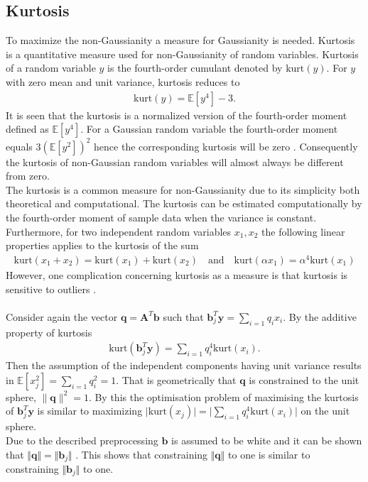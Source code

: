 \subsection{Kurtosis}
To maximize the non-Gaussianity a measure for Gaussianity is needed. Kurtosis is a quantitative measure used for non-Gaussianity of random variables. 
Kurtosis of a random variable $y$ is the fourth-order cumulant denoted by $\text{kurt}(y)$. 
For $y$ with zero mean and unit variance, kurtosis reduces to 
\begin{align*}
\text{kurt} (y) = \mathbb{E}[y^4] - 3.
\end{align*} 
It is seen that the kurtosis is a normalized version of the fourth-order moment defined as $\mathbb{E}[y^4]$. 
For a Gaussian random variable the fourth-order moment equals $3(\mathbb{E}[y^2])^2$ hence the corresponding kurtosis will be zero \cite[p. 171]{ICA}. 
Consequently the kurtosis of non-Gaussian random variables will almost always be different from zero.
\\
The kurtosis is a common measure for non-Gaussianity due to its simplicity  both theoretical and computational. 
The kurtosis can be estimated computationally by the fourth-order moment of sample data when the variance is constant.
Furthermore, for two independent random variables $x_1, x_2$ the following linear properties applies to the kurtosis of the sum
\begin{align*}
\text{kurt}(x_1 + x_2)=\text{kurt}(x_1)+ \text{kurt}(x_2) \quad \text{and} \quad \text{kurt}(\alpha x_1) = \alpha^4 \text{kurt}(x_1)
\end{align*}  
However, one complication concerning kurtosis as a measure is that kurtosis is sensitive to outliers \cite[p. 182]{ICA}.
\\ \\      
Consider again the vector $\textbf{q} = \textbf{A}^T\textbf{b}$ such that $\textbf{b}_{j}^T \textbf{y} = \sum_{i=1}q_ix_i$. 
By the additive property of kurtosis
\begin{align*}
\text{kurt}\left( \textbf{b}_{j}^T \textbf{y}\right) = \sum_{i=1}q_i^4\text{kurt}(x_i).
\end{align*}
Then the assumption of the independent components having unit variance results in $\mathbb{E}[x_j^2]= \sum_{i=1}q_i^2=1$. 
That is geometrically that $\textbf{q}$ is constrained to the unit sphere, $\| \textbf{q}\|^2 = 1$. 
By this the optimisation problem of maximising the kurtosis of $\textbf{b}_{j}^T \textbf{y}$ is similar to maximizing $\vert \text{kurt}(x_j)\vert = \vert \sum_{i=1}q_i^4\text{kurt}(x_i) \vert $ on the unit sphere.
\\
Due to the described preprocessing $\textbf{b}$ is assumed to be white and it can be shown that $\Vert \textbf{q} \Vert = \Vert \textbf{b}_j \Vert$ \cite[p. 174]{ICA}. 
This shows that constraining $\Vert \textbf{q} \Vert$ to one is similar to constraining $\Vert \textbf{b}_j \Vert$ to one. 

